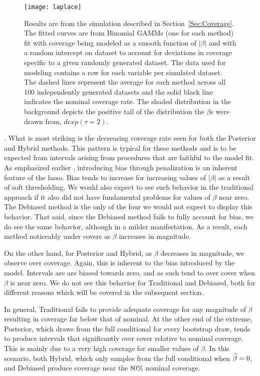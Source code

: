 \begin{figure}
  \texttt{[image: laplace]}
  \caption{\label{Fig:laplace} Results are from the simulation described in Section~\ref{Sec:Coverage}. The fitted curves are from Binomial GAMMs (one for each method) fit with coverage being modeled as a smooth function of $|\beta|$ and with a random intercept on dataset to account for deviations in coverage specific to a given randomly generated dataset. The data used for modeling contains a row for each variable per simulated dataset. The dashed lines represent the average for each method across all 100 independently generated datasets and the solid black line indicates the nominal coverage rate. The shaded distribution in the background depicts the positive tail of the distribution the $\beta$s were drawn from, $dexp(\tau = 2)$.}
\end{figure}

. What is most striking is the decreasing coverage rate seen for both the Posterior and Hybrid methods. This pattern is typical for these methods and is to be expected from intervals arising from procedures that are faithful to the model fit. As emphasized earlier , introducing bias through penalization is an inherent feature of the lasso. Bias tends to increase for increasing values of $|\beta|$ as a result of soft thresholding. We would also expect to see such behavior in the traditional approach if it also did not have fundamental problems for values of $\beta$ near zero. The Debiased method is the only of the four we would not expect to display this behavior. That said, since the Debiased method fails to fully account for bias, we do see the same behavior, although in a milder manifestation. As a result, each method noticeably under covers as $\beta$ increases in magnitude.

On the other hand, for Posterior and Hybrid, as $\beta$ decreases in magnitude, we observe over coverage. Again, this is inherent to the bias introduced by the model. Intervals are are biased towards zero, and as such tend to over cover when $\beta$ is near zero. We do not see this behavior for Traditional and Debiased, both for different reasons which will be covered in the subsequent section. 

In general, Traditional fails to provide adequate coverage for any magnitude of $\beta$ resulting in coverage far below that of nominal. At the other end of the extreme, Posterior, which draws from the full conditional for every bootstrap draw, tends to produce intervals that significantly over cover relative to nominal coverage. This is mainly due to a very high coverage for smaller values of $\beta$. In this scenario, both Hybrid, which only samples from the full conditional when $\widehat{\beta} = 0$, and Debiased produce coverage near the $80\%$ nominal coverage.

